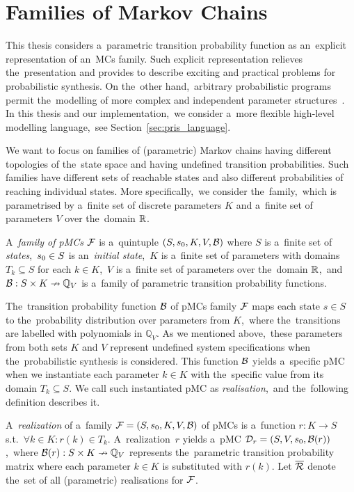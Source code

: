 \section{Families of Markov Chains}
This thesis considers a~parametric transition probability function as an~explicit representation of an~MCs family.
Such explicit representation relieves the~presentation and provides to describe exciting and practical problems for probabilistic synthesis.
On the~other hand,~arbitrary probabilistic programs permit the~modelling of more complex and independent parameter structures~\cite{cegar}.
In this thesis and our implementation,~we consider a~more flexible high-level modelling language,~see Section~\ref{sec:pris_language}.

We want to focus on families of (parametric) Markov chains having different topologies of the~state space and having undefined transition probabilities.
Such families have different sets of reachable states and also different probabilities of reaching individual states.
More specifically,~we consider the~family,~which is parametrised by a~finite set of discrete parameters $K$ and a~finite set of parameters $V$ over the~domain $\mathbb{R}$.

\begin{definition}
\cite{cegar}
    A~\emph{family of pMCs} $\mathcal{F}$ is a~quintuple $(S,s_{0},K, V, \mathcal{B})$  where $S$ is a~finite set of \emph{states},~$s_{0} \in S$ is an~\emph{initial state},~$K$ is a~finite set of parameters with domains $T_k \subseteq S$ for each $k \in K$,~$V$ is a~finite set of parameters over the~domain $\mathbb{R}$,~and $\mathcal{B} : S \times K \nrightarrow \mathbb{Q}_V$ is a~family of parametric transition probability functions.
\end{definition}

The~transition probability function $\mathcal{B}$ of pMCs family $\mathcal{F}$ maps each state $s \in S$ to the~probability distribution over parameters from $K$,~where the~transitions are labelled with polynomials in $\mathbb{Q}_V$.
As we mentioned above,~these parameters from both sets $K$ and $V$ represent undefined system specifications when the~probabilistic synthesis is considered.
This function $\mathcal{B}$ yields a~specific pMC when we instantiate each parameter $k \in K$ with the~specific value from its domain $T_k \subseteq S$.
We call such instantiated pMC as \textit{realisation},~and the~following definition describes it.

\begin{definition}[Realisation]
\cite{cegar}
A~\emph{realization} of a~family $\mathcal{F} = (S,s_{0},K, V, \mathcal{B})$ of pMCs is a~function $r: K \rightarrow S$ s.t.~$\forall k \in K :  r(k) \in T_k$. 
A~realization~$r$ yields a~pMC $\mathcal{D}_r = (S, V, s_{0},\mathcal{B}(r))$,~where $\mathcal{B}(r): S \times K \nrightarrow \mathbb{Q}_V$ represents the~parametric transition probability matrix where each parameter $k \in K$ is substituted with $r(k)$. 
Let $\overline{\mathcal{R}}$ denote the~set of all (parametric) realisations for $\mathcal{F}$.
\end{definition}

